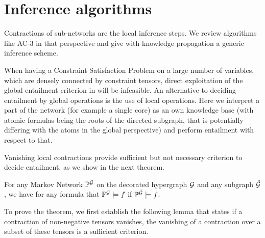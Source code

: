 \section{Inference algorithms}

Contractions of sub-networks are the local inference steps.
We review algorithms like AC-3 in that perspective and give with knowledge propagation a generic inference scheme.



When having a Constraint Satisfaction Problem on a large number of variables, which are densely connected by constraint tensors, direct exploitation of the global entailment criterion in  will be infeasible.
An alternative to deciding entailment by global operations is the use of local operations.
Here we interpret a part of the network (for example a single core) as an own knowledge base (with atomic formulas being the roots of the directed subgraph, that is potentially differing with the atoms in the global perspective) and perform entailment with respect to that.




Vanishing local contractions provide sufficient but not necessary criterion to decide entailment, as we show in the next theorem.

\begin{theorem}
    \label{the:monotonEntailment}
    For any Markov Network $\mathbb{P}^{\mathcal{G}}$ on the decorated hypergraph $\mathcal{G}$ and any subgraph $\tilde{\mathcal{G}}$, we have for any formula that $\mathbb{P}^{\mathcal{G}}\models f$ if $\mathbb{P}^{\tilde{\mathcal{G}}}\models f$.
\end{theorem}

To prove the theorem, we first establish the following lemma that states if a contraction of non-negative tensors vanishes, the vanishing of a contraction over a subset of these tensors is a sufficient criterion.

